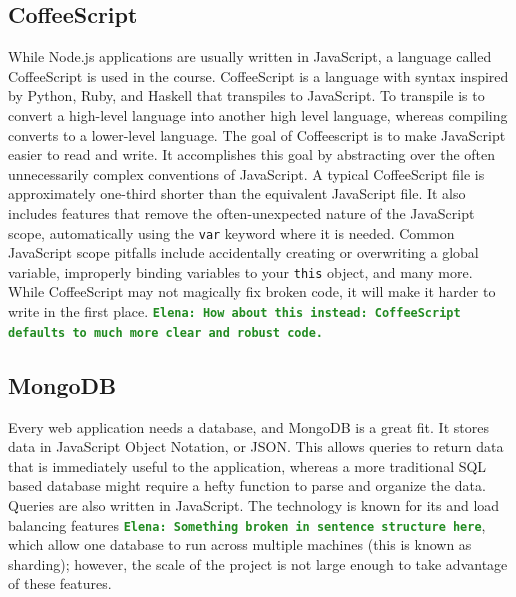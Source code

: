 \documentclass[12pt]{article}
\newcommand{\comment}[1]{{\bf \tt  {#1}}}
\newcommand{\emcomment}[1]{\textcolor{ForestGreen}{\comment{Elena: {#1}}}}
\newcommand{\code}[1]{{\texttt {#1}}}
\begin{document}
\subsection{CoffeeScript}\label{sec:coffee}
While Node.js applications are usually written in JavaScript, a language called CoffeeScript is used in the course. CoffeeScript is a language with syntax inspired by Python, Ruby, and Haskell that transpiles to JavaScript. To transpile is to convert a high-level language into another high level language, whereas compiling converts to a lower-level language. The goal of Coffeescript is to make JavaScript easier to read and write. It accomplishes this goal by abstracting over the often unnecessarily complex conventions of JavaScript. A typical CoffeeScript file is approximately one-third shorter than the equivalent JavaScript file. It also includes features that remove the often-unexpected nature of the JavaScript scope, automatically using the \code{var} keyword where it is needed. Common JavaScript scope pitfalls include accidentally creating or overwriting a global variable, improperly binding variables to your \code{this} object, and many more. While CoffeeScript may not magically fix broken code, it will make it harder to write in the first place.
 \emcomment{How about this instead: CoffeeScript defaults to much more clear and robust code.}


\subsection{MongoDB}\label{sec:mongo}
Every web application needs a database, and MongoDB is a great fit. It stores data in JavaScript Object Notation, or JSON. This allows queries to return data that is immediately useful to the application, whereas a more traditional SQL based database might require a hefty function to parse and organize the data. Queries are also written in JavaScript. The technology is known for its and load balancing features \emcomment{Something broken in sentence structure here}, which allow one database to run across multiple machines (this is known as sharding); however, the scale of the project is not large enough to take advantage of these features.
\end{document}
